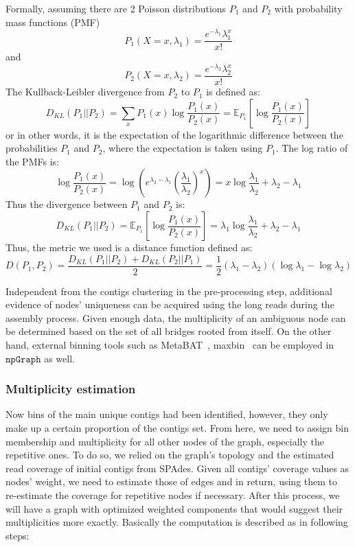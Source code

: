 \documentclass[10pt,letterpaper]{article}
\newcommand{\npgraph}{$\mathtt{npGraph}$}
\begin{document}
Formally, assuming there are 2 Poisson distributions $P_1$ and $P_2$ with probability mass functions (PMF) $$P_1(X=x,\lambda_1)=\frac{e^{-\lambda_1}\lambda_1^x}{x!}$$ and $$P_2(X=x,\lambda_2)=\frac{e^{-\lambda_2}\lambda_2^x}{x!}$$ 
The Kullback-Leibler divergence from $P_2$ to $P_1$ is defined as:
$$D_{KL}(P_1||P_2)=\sum_{x}{P_1(x)\log{\frac{P_1(x)}{P_2(x)}}}=\mathbb{E}_{P_1}[\log{\frac{P_1(x)}{P_2(x)}}]$$
or in other words,  it is the expectation of the logarithmic difference between the probabilities $P_1$ and $P_2$, where the expectation is taken using $P_1$.
The log ratio of the PMFs is:
$$\log{\frac{P_1(x)}{P_2(x)}}=\log{(e^{\lambda_2-\lambda_1}{(\frac{\lambda_1}{\lambda_2})}^x)}=x\log{\frac{\lambda_1}{\lambda_2}}+\lambda_2-\lambda_1$$
Thus the divergence between $P_1$ and $P_2$ is:
$$D_{KL}(P_1||P_2)=\mathbb{E}_{P_1}[\log{\frac{P_1(x)}{P_2(x)}}]=\lambda_1\log{\frac{\lambda_1}{\lambda_2}}+\lambda_2-\lambda_1$$
Thus, the metric we used is a distance function defined as:
$$D(P_1,P_2)=\frac{D_{KL}(P_1||P_2)+D_{KL}(P_2||P_1)}{2}=\frac{1}{2}(\lambda_1-\lambda_2)(\log{\lambda_1}-\log{\lambda_2})$$

Independent from the contigs clustering in the pre-processing step, additional evidence of nodes' uniqueness can be acquired using the long reads during the assembly process. Given enough data, the multiplicity of an ambiguous node can be determined based on the set of all bridges rooted from itself.
On the other hand, external binning tools such as MetaBAT~\cite{Kang2015metabat}, maxbin~\cite{Wu2014maxbin} can be employed in \npgraph{} as well.
\subsubsection*{Multiplicity estimation}
Now bins of the main unique contigs had been identified, however, they only make up a certain proportion of the contigs set. From here, we need to assign bin membership and multiplicity for all other nodes of the graph, especially the repetitive ones. To do so, we relied on the graph's topology and the estimated read coverage of initial contigs from SPAdes.
Given all contigs' coverage values as nodes' weight, we need to estimate those of edges and in return, using them to re-estimate the coverage for repetitive nodes if necessary. After this process, we will have a graph with optimized weighted components that would suggest their multiplicities more exactly. Basically the computation is described as in following steps:
\end{document}
